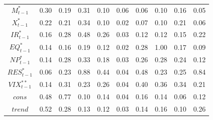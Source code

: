 \documentclass[a4paper, twoside]{templates/ociamthesis}
\begin{document}
\begin{table}[!ht]
\begin{tabular}[t]{cccccccccc}
$M^*_{t-1}$ & 0.30 & 0.19 & 0.31 & 0.10 & 0.06 & 0.06 & 0.10 & 0.16 & 0.05\\
$X^*_{t-1}$ & 0.22 & 0.21 & 0.34 & 0.10 & 0.02 & 0.07 & 0.10 & 0.21 & 0.06\\
$IR^*_{t-1}$ & 0.16 & 0.28 & 0.48 & 0.26 & 0.03 & 0.12 & 0.12 & 0.15 & 0.22\\
$EQ^*_{t-1}$ & 0.14 & 0.16 & 0.19 & 0.12 & 0.02 & 0.28 & 1.00 & 0.17 & 0.09\\
$NP^*_{t-1}$ & 0.14 & 0.28 & 0.33 & 0.18 & 0.03 & 0.26 & 0.28 & 0.24 & 0.12\\
$RES^*_{t-1}$ & 0.06 & 0.23 & 0.88 & 0.44 & 0.04 & 0.48 & 0.23 & 0.25 & 0.84\\
$VIX^{**}_{t-1}$ & 0.14 & 0.31 & 0.23 & 0.26 & 0.04 & 0.40 & 0.36 & 0.34 & 0.21\\
$cons$ & 0.48 & 0.77 & 0.10 & 0.14 & 0.04 & 0.16 & 0.14 & 0.06 & 0.12\\
$trend$ & 0.52 & 0.28 & 0.13 & 0.12 & 0.03 & 0.14 & 0.16 & 0.10 & 0.26\\
\bottomrule
\end{tabular}
\end{table}
\end{document}
